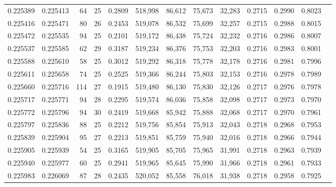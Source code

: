 \begin{tabular}{rrrrrrrrrrrrr}
0.225389 & 0.225413 &  64 &  25 &                                     0.2809 & 518,998 &  86,612 &  75,673 &  32,283 & 0.2715 & 0.2990 & 0.8023 \\
0.225416 & 0.225471 &  80 &  26 &                                     0.2453 & 519,078 &  86,532 &  75,699 &  32,257 & 0.2715 & 0.2988 & 0.8015 \\
0.225472 & 0.225535 &  94 &  25 &                                     0.2101 & 519,172 &  86,438 &  75,724 &  32,232 & 0.2716 & 0.2986 & 0.8007 \\
0.225537 & 0.225585 &  62 &  29 &                                     0.3187 & 519,234 &  86,376 &  75,753 &  32,203 & 0.2716 & 0.2983 & 0.8001 \\
0.225588 & 0.225610 &  58 &  25 &                                     0.3012 & 519,292 &  86,318 &  75,778 &  32,178 & 0.2716 & 0.2981 & 0.7996 \\
0.225611 & 0.225658 &  74 &  25 &                                     0.2525 & 519,366 &  86,244 &  75,803 &  32,153 & 0.2716 & 0.2978 & 0.7989 \\
0.225660 & 0.225716 & 114 &  27 &                                     0.1915 & 519,480 &  86,130 &  75,830 &  32,126 & 0.2717 & 0.2976 & 0.7978 \\
0.225717 & 0.225771 &  94 &  28 &                                     0.2295 & 519,574 &  86,036 &  75,858 &  32,098 & 0.2717 & 0.2973 & 0.7970 \\
0.225772 & 0.225796 &  94 &  30 &                                     0.2419 & 519,668 &  85,942 &  75,888 &  32,068 & 0.2717 & 0.2970 & 0.7961 \\
0.225797 & 0.225836 &  88 &  25 &                                     0.2212 & 519,756 &  85,854 &  75,913 &  32,043 & 0.2718 & 0.2968 & 0.7953 \\
0.225839 & 0.225904 &  95 &  27 &                                     0.2213 & 519,851 &  85,759 &  75,940 &  32,016 & 0.2718 & 0.2966 & 0.7944 \\
0.225905 & 0.225939 &  54 &  25 &                                     0.3165 & 519,905 &  85,705 &  75,965 &  31,991 & 0.2718 & 0.2963 & 0.7939 \\
0.225940 & 0.225977 &  60 &  25 &                                     0.2941 & 519,965 &  85,645 &  75,990 &  31,966 & 0.2718 & 0.2961 & 0.7933 \\
0.225983 & 0.226069 &  87 &  28 &                                     0.2435 & 520,052 &  85,558 &  76,018 &  31,938 & 0.2718 & 0.2958 & 0.7925 \\

\end{tabular}
